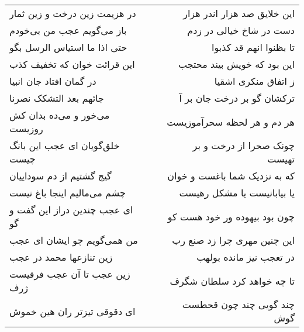 \begin{center}
\begin{longtable}{l p{0.5cm} r}
در هزیمت زین درخت و زین ثمار
&&
این خلایق صد هزار اندر هزار
\\
باز می‌گویم عجب من بی‌خودم
&&
دست در شاخ خیالی در زدم
\\
حتی اذا ما استیاس الرسل بگو
&&
تا بظنوا انهم قد کذبوا
\\
این قرائت خوان که تخفیف کذب
&&
این بود که خویش بیند محتجب
\\
در گمان افتاد جان انبیا
&&
ز اتفاق منکری اشقیا
\\
جائهم بعد التشکک نصرنا
&&
ترکشان گو بر درخت جان بر آ
\\
می‌خور و می‌ده بدان کش روزیست
&&
هر دم و هر لحظه سحرآموزیست
\\
خلق‌گویان ای عجب این بانگ چیست
&&
چونک صحرا از درخت و بر تهیست
\\
گیج گشتیم از دم سوداییان
&&
که به نزدیک شما باغست و خوان
\\
چشم می‌مالیم اینجا باغ نیست
&&
یا بیابانیست یا مشکل رهیست
\\
ای عجب چندین دراز این گفت و گو
&&
چون بود بیهوده ور خود هست کو
\\
من همی‌گویم چو ایشان ای عجب
&&
این چنین مهری چرا زد صنع رب
\\
زین تنازعها محمد در عجب
&&
در تعجب نیز مانده بولهب
\\
زین عجب تا آن عجب فرقیست ژرف
&&
تا چه خواهد کرد سلطان شگرف
\\
ای دقوقی تیزتر ران هین خموش
&&
چند گویی چند چون قحطست گوش
\\
\end{longtable}
\end{center}
